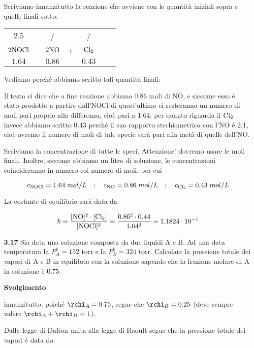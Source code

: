 \vspace{0.2cm}Scriviamo innanzitutto la reazione che avviene con le quantità iniziali sopra e quelle finali sotto: 

\begin{center}
    \begin{tabular}{ccccccc}
        $2.5$ & & / & & /\\
        $\rm 2NOCl$ & \ce{<-->} & $\rm 2NO$ & + & $\rm Cl_2$\\
        $1.64$ & & $0.86$ & & $0.43$\\
    \end{tabular}
\end{center}

Vediamo perché abbiamo scritto tali quantità finali:

Il testo ci dice che a fine reazione abbiamo 0.86 moli di NO, e siccome esso è stato prodotto a partire dall'NOCl di quest'ultimo ci resteranno un numero di moli pari proprio alla differenza, cioè pari a 1.64; per quanto riguarda il $\rm Cl_2$ invece abbiamo scritto 0.43 perché il suo rapporto stechiometrico con l'NO è 2:1, cioè avremo il numero di moli di tale specie sarà pari alla metà di quelle dell'NO.

Scriviamo la concentrazione di tutte le speci. Attenzione! dovremo usare le moli finali. Inoltre, siccome abbiamo un litro di soluzione, le concentrazioni coincideranno in numero col numero di moli, per cui

$$c_{\rm NOCl}=1.64\;mol/L
\quad;\quad
c_{\rm NO}=0.86\;mol/L
\quad;\quad
c_{\rm Cl_2}=0.43\;mol/L$$

La costante di equilibrio sarà data da

$$k=\rm \frac{[NO]^2 \cdot [Cl_2]}{[NOCl]^2}
=\frac{0.86^2 \cdot 0.44}{1.64^2}=1.1824 \cdot 10^{-1}$$

\vspace{0.2cm}\textbf{3.17} Sia data una soluzione composta da due liquidi A e B. Ad una data temperatura la $P^0_A = 152$ torr
e la $P^0_B = 324$ torr. Calcolare la pressione totale dei vapori di A e B in equilibrio con la soluzione sapendo che la frazione molare di A in soluzione è 0.75.

\vspace{0.2cm}\large\textbf{Svolgimento}\normalsize

\vspace{0.2cm}innanzitutto, poiché $\rchi_A=0.75$, segue che $\rchi_B=0.25$ (deve sempre valere $\rchi_A + \rchi_B =1$).

Dalla legge di Dalton unita alla legge di Raoult segue che la pressione totale dei vapori è data da


